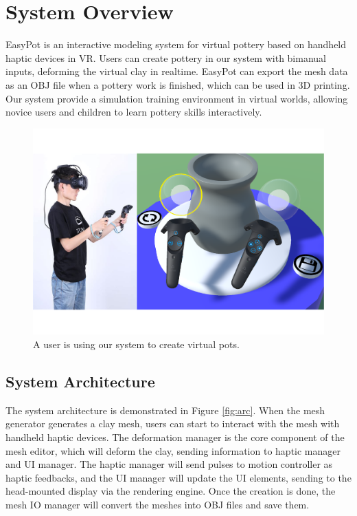 \documentclass{svjour3}                     %
\begin{document}
\section{System Overview}
\label{sec:3}
EasyPot is an interactive modeling system for virtual pottery based on handheld haptic devices in VR.
Users can create pottery in our system with bimanual inputs, deforming the virtual clay in realtime.
EasyPot can export the mesh data as an OBJ file when a pottery work is finished, which can be used in 3D printing.
Our system provide a simulation training environment in virtual worlds, allowing novice users and children to learn pottery skills interactively.

\begin{figure}
\includegraphics[width=\textwidth]{fig1}
\caption{A user is using our system to create virtual pots.}
\label{fig:results}
\end{figure}

\subsection{System Architecture}
\label{sec:3.1}

The system architecture is demonstrated in Figure \ref{fig:arc}. When the mesh generator generates a clay mesh, users can start to interact with the mesh with handheld haptic devices. The deformation manager is the core component of the mesh editor, which will deform the clay, sending information to haptic manager and UI manager. The haptic manager will send pulses to motion controller as haptic feedbacks, and the UI manager will update the UI elements, sending to the head-mounted display via the rendering engine. Once the creation is done, the mesh IO manager will convert the meshes into OBJ files and save them.
\end{document}
